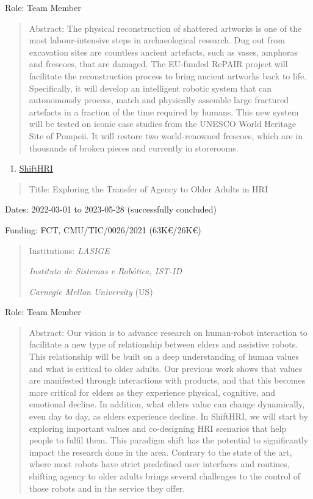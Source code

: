 Role: Team Member

\begin{quote}
Abstract: The physical reconstruction of shattered artworks is one of
the most labour-intensive steps in archaeological research. Dug out from
excavation sites are countless ancient artefacts, such as vases,
amphoras and frescoes, that are damaged. The EU-funded RePAIR project
will facilitate the reconstruction process to bring ancient artworks
back to life. Specifically, it will develop an intelligent robotic
system that can autonomously process, match and physically assemble
large fractured artefacts in a fraction of the time required by humans.
This new system will be tested on iconic case studies from the UNESCO
World Heritage Site of Pompeii. It will restore two world-renowned
frescoes, which are in thousands of broken pieces and currently in
storerooms.
\end{quote}

\begin{enumerate}
\def\labelenumi{\arabic{enumi}.}
\setcounter{enumi}{1}
\item
  \ul{ShiftHRI}
\end{enumerate}

\begin{quote}
Title: Exploring the Transfer of Agency to Older Adults in HRI
\end{quote}

Dates: 2022-03-01 to 2023-05-28 (successfully concluded)

Funding: FCT, CMU/TIC/0026/2021 (63K€/26K€)

\begin{quote}
Institutions: \emph{LASIGE}

\emph{Instituto de Sistemas e Robótica, IST-ID}

\emph{Carnegie Mellon University} (US)
\end{quote}

Role: Team Member

\begin{quote}
Abstract: Our vision is to advance research on human-robot interaction
to facilitate a new type of relationship between elders and assistive
robots. This relationship will be built on a deep understanding of human
values and what is critical to older adults. Our previous work shows
that values are manifested through interactions with products, and that
this becomes more critical for elders as they experience physical,
cognitive, and emotional decline. In addition, what elders value can
change dynamically, even day to day, as elders experience decline. In
ShiftHRI, we will start by exploring important values and co-designing
HRI scenarios that help people to fulfil them. This paradigm shift has
the potential to significantly impact the research done in the area.
Contrary to the state of the art, where most robots have strict
predefined user interfaces and routines, shifting agency to older adults
brings several challenges to the control of those robots and in the
service they offer.
\end{quote}

